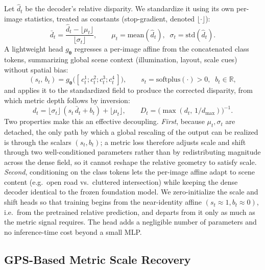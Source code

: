 Let \(\hat d_t\) be the decoder's relative disparity. We standardize it using its own per-image statistics, treated as constants (stop-gradient, denoted \(\lfloor\cdot\rfloor\)):
\begin{equation}
\bar d_t = \frac{\hat d_t - \lfloor\mu_t\rfloor}{\lfloor\sigma_t\rfloor},
\qquad \mu_t = \mathrm{mean}(\hat d_t),\;\; \sigma_t = \mathrm{std}(\hat d_t).
\end{equation}
A lightweight head \(g_{\boldsymbol\theta}\) regresses a per-image affine from the concatenated class tokens, summarizing global scene context (illumination, layout, scale cues) without spatial bias:
\begin{equation}
(s_t,\, b_t) = g_{\boldsymbol\theta}\big([\,c^{1}_t; c^{2}_t; c^{3}_t; c^{4}_t\,]\big),
\qquad s_t = \mathrm{softplus}(\cdot) > 0,\;\; b_t \in \mathbb{R},
\end{equation}
and applies it to the standardized field to produce the corrected disparity, from which metric depth follows by inversion:
\begin{equation}
d_t = \lfloor\sigma_t\rfloor\,(s_t\, \bar d_t + b_t) + \lfloor\mu_t\rfloor,
\qquad
D_t = \big(\max(d_t,\, 1/d_{\max})\big)^{-1}.
\label{eq:scaleshift}
\end{equation}
Two properties make this an effective decoupling. \emph{First}, because \(\mu_t,\sigma_t\) are detached, the only path by which a global rescaling of the output can be realized is through the scalars \((s_t,b_t)\); a metric loss therefore adjusts scale and shift through two well-conditioned parameters rather than by redistributing magnitude across the dense field, so it cannot reshape the relative geometry to satisfy scale. \emph{Second}, conditioning on the class tokens lets the per-image affine adapt to scene content (e.g.\ open road vs.\ cluttered intersection) while keeping the dense decoder identical to the frozen foundation model. We zero-initialize the scale and shift heads so that training begins from the near-identity affine \((s_t\!\approx\!1, b_t\!\approx\!0)\), i.e.\ from the pretrained relative prediction, and departs from it only as much as the metric signal requires. The head adds a negligible number of parameters and no inference-time cost beyond a small MLP.

\subsection{GPS-Based Metric Scale Recovery}

